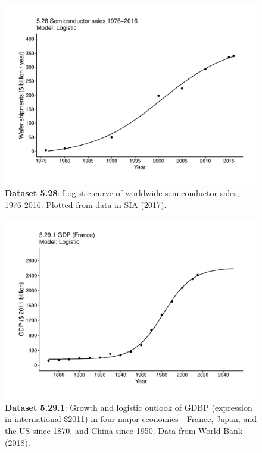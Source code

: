 \documentclass[aps,rmp,preprint,superscriptaddress,10pt,onecolumn]{article}
\begin{document}
\clearpage
\begin{figure}[h]
\includegraphics[width=\textwidth]{output/figs-ggplot/5.28.pdf}
\caption{\textbf{Dataset 5.28}: Logistic curve of worldwide semiconductor sales, 1976-2016. Plotted from data in SIA (2017).}
\end{figure}
	
\clearpage
\begin{figure}[h]
\includegraphics[width=\textwidth]{output/figs-ggplot/5.29.1.pdf}
\caption{\textbf{Dataset 5.29.1}: Growth and logistic outlook of GDBP (expression in international \$2011) in four major economies - France, Japan, and the US since 1870, and China since 1950. Data from World Bank (2018).}
\end{figure}
	
\end{document}
